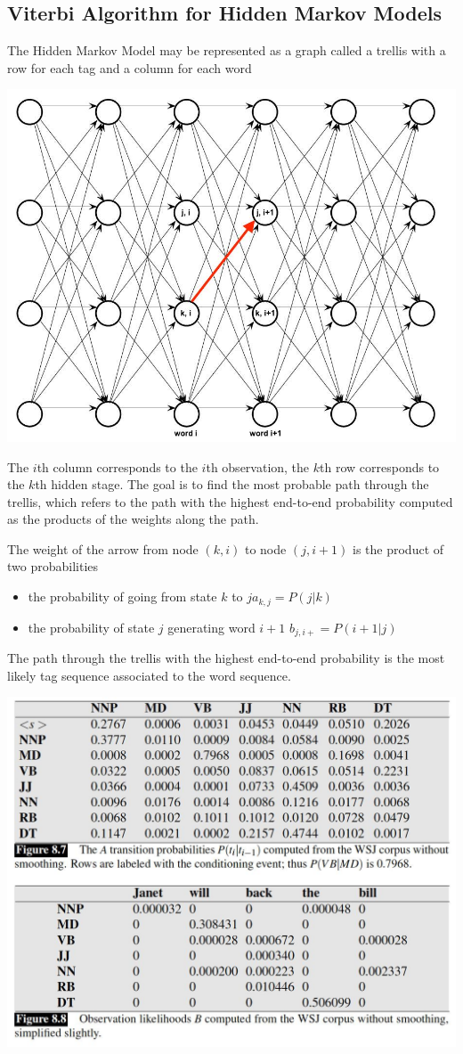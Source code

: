 \documentclass[11pt]{article}
\begin{document}
\subsection{Viterbi Algorithm for Hidden Markov Models}
The Hidden Markov Model may be represented as a graph called a trellis with a row for each tag and a column for each word
\begin{center}
	\includegraphics[width=0.5\linewidth]{img/vitrelli_trellis}
\end{center}
The $i$th column corresponds to the $i$th observation, the $k$th row corresponds to the $k$th hidden stage. The goal is to find the most probable path through the trellis, which refers to the path with the highest end-to-end probability computed as the products of the weights along the path.

The weight of the arrow from node $(k,i)$ to node $(j,i+1)$ is the product of two probabilities
\begin{itemize}[noitemsep,nosep]
	\item the probability of going from state $k$ to $j$\qquad $a_{k,j} = P(j|k)$
	\item the probability of state $j$ generating word $i+1$ \qquad $b_{j,i+} = P(i+1|j)$
\end{itemize}
The path through the trellis with the highest end-to-end probability is the most likely tag sequence associated to the word sequence.

\begin{center}
	\includegraphics[width=0.6\linewidth]{img/vitrelli_trellis_example}
\end{center}
\end{document}

